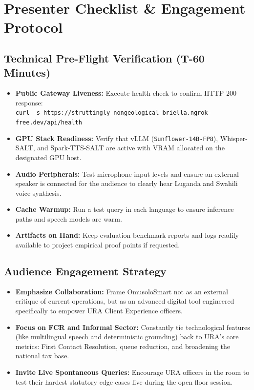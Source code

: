 \documentclass[10pt,a4paper]{article}
\begin{document}
\section{Presenter Checklist \& Engagement Protocol}

\subsection{Technical Pre-Flight Verification (T-60 Minutes)}
\begin{itemize}
  \item[\checkmark] \textbf{Public Gateway Liveness:} Execute health check to confirm HTTP 200 response:\\
  \texttt{curl -s https://struttingly-nongeological-briella.ngrok-free.dev/api/health}
  \item[\checkmark] \textbf{GPU Stack Readiness:} Verify that vLLM (\texttt{Sunflower-14B-FP8}), Whisper-SALT, and Spark-TTS-SALT are active with VRAM allocated on the designated GPU host.
  \item[\checkmark] \textbf{Audio Peripherals:} Test microphone input levels and ensure an external speaker is connected for the audience to clearly hear Luganda and Swahili voice synthesis.
  \item[\checkmark] \textbf{Cache Warmup:} Run a test query in each language to ensure inference paths and speech models are warm.
  \item[\checkmark] \textbf{Artifacts on Hand:} Keep evaluation benchmark reports and logs readily available to project empirical proof points if requested.
\end{itemize}

\subsection{Audience Engagement Strategy}
\begin{itemize}
  \item \textbf{Emphasize Collaboration:} Frame OmusoloSmart not as an external critique of current operations, but as an advanced digital tool engineered specifically to empower URA Client Experience officers.
  \item \textbf{Focus on FCR and Informal Sector:} Constantly tie technological features (like multilingual speech and deterministic grounding) back to URA's core metrics: First Contact Resolution, queue reduction, and broadening the national tax base.
  \item \textbf{Invite Live Spontaneous Queries:} Encourage URA officers in the room to test their hardest statutory edge cases live during the open floor session.
\end{itemize}
\end{document}
